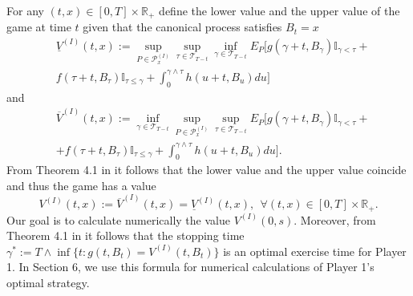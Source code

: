 \documentclass{amsart}
\numberwithin{equation}{section}
\begin{document}
For any $(t,x)\in [0,T]\times\mathbb R_{+}$ define the lower value and the upper value of the game at time $t$ given that the canonical
process satisfies $B_t=x$
\begin{eqnarray*}
&\underline{V}^{(I)}(t,x):=
\sup_{P\in \mathcal{P}^{(I)}_x}\sup_{\tau\in\mathcal T_{T-t}}\inf_{\gamma\in\mathcal T_{T-t}}E_{P}[g(\gamma+t, B_{\gamma}){\mathbb I}_{\gamma<\tau}+\\
&f(\tau+t,B_{\tau})\mathbb{I}_{\tau\leq\gamma}
+\int_{0}^{\gamma\wedge\tau}h(u+t, B_{u})du ]
\end{eqnarray*}
and
\begin{eqnarray*}
&\overline{V}^{(I)}(t,x):=\inf_{\gamma\in\mathcal T_{T-t}}\sup_{ P\in \mathcal{P}^{(I)}_x}\sup_{\tau\in\mathcal T_{T-t}}E_{P}
[g(\gamma+t,B_{\gamma})\mathbb{I}_{\gamma<\tau}+\nonumber\\
&+f(\tau+t,B_{\tau})\mathbb{I}_{\tau\leq\gamma}+\int_{0}^{\gamma\wedge\tau}h(u+t,B_{u})du].
\nonumber
\end{eqnarray*}
From Theorem 4.1 in \cite{BY} it follows that the lower value and the upper value coincide and thus the game has a value
\begin{equation}\label{2.2-}
V^{(I)}(t,x):=\overline{V}^{(I)}(t,x)=\underline{V}^{(I)}(t,x), \ \ \forall(t,x)\in [0,T]\times\mathbb R_{+}.
\end{equation}
Our goal is to calculate numerically the value $V^{(I)}(0,s)$. Moreover, from Theorem 4.1 in \cite{BY} it follows that
the stopping time
$\gamma^{*}:=T\wedge\inf\{t: g(t,B_t)=V^{(I)}(t,B_t)\}$ is an optimal exercise time for Player 1. In Section 6,
we use this formula for numerical calculations
of Player 1's optimal strategy.
\end{document}

